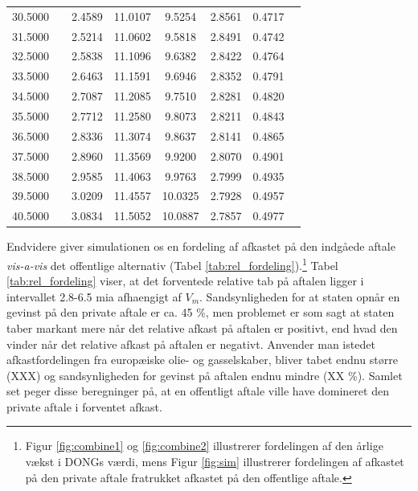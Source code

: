 \documentclass{article}
\begin{document}
\begin{table}[h]
\begin{tabularx}{\linewidth}{cXcccccr}
30.5000&& 2.4589&11.0107& 9.5254& 2.8561& 0.4717\\
31.5000&& 2.5214&11.0602& 9.5818& 2.8491& 0.4742\\
32.5000&& 2.5838&11.1096& 9.6382& 2.8422& 0.4764\\
33.5000&& 2.6463&11.1591& 9.6946& 2.8352& 0.4791\\
34.5000&& 2.7087&11.2085& 9.7510& 2.8281& 0.4820\\
35.5000&& 2.7712&11.2580& 9.8073& 2.8211& 0.4843\\
36.5000&& 2.8336&11.3074& 9.8637& 2.8141& 0.4865\\
37.5000&& 2.8960&11.3569& 9.9200& 2.8070& 0.4901\\
38.5000&& 2.9585&11.4063& 9.9763& 2.7999& 0.4935\\
39.5000&& 3.0209&11.4557&10.0325& 2.7928& 0.4957\\
40.5000&& 3.0834&11.5052&10.0887& 2.7857& 0.4977\\
\bottomrule[1pt]
	\end{tabularx}
	\begin{minipage}{\linewidth}
	\end{minipage}
\end{table}


Endvidere giver simulationen os en fordeling af afkastet på den indgåede aftale \emph{vis-a-vis} det offentlige alternativ (Tabel \ref{tab:rel_fordeling}).\footnote{Figur \ref{fig:combine1} og \ref{fig:combine2} illustrerer fordelingen af den årlige vækst i DONGs værdi, mens Figur \ref{fig:sim} illustrerer fordelingen af afkastet på den private aftale fratrukket afkastet på den offentlige aftale.} Tabel \ref{tab:rel_fordeling} viser, at det forventede relative tab på aftalen ligger i intervallet 2.8-6.5 mia afhaengigt af $V_m$. Sandsynligheden for at staten opnår en gevinst på den private aftale er ca. 45 \%, men problemet er som sagt at staten taber markant mere når det relative afkast på aftalen er positivt, end hvad den vinder når det relative afkast på aftalen er negativt. Anvender man istedet afkastfordelingen fra europæiske olie- og gasselskaber, bliver tabet endnu større (XXX) og sandsynligheden for gevinst på aftalen endnu mindre (XX  \%). Samlet set peger disse beregninger på, at en offentligt aftale ville have domineret den private aftale i forventet afkast.
\end{document}
